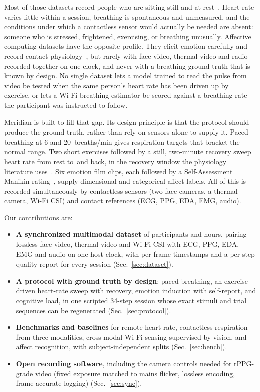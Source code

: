 \documentclass[10pt,twocolumn,letterpaper]{article}
\newcommand{\ph}[1]{\textbf{\fbox{UNFILLED: #1}}}
\newcommand{\ph}[1]{{\color{red}\texttt{[#1]}}}
\newcommand{\bpm}{\,\mathrm{bpm}}
\newcommand{\dataset}{Meridian\xspace}
\begin{document}
Most of those datasets record people who are sitting still and at rest~\cite{bobbia2019,stricker2014pure}. Heart
rate varies little within a session, breathing is spontaneous and unmeasured, and the conditions under which a
contactless sensor would actually be needed are absent: someone who is stressed, frightened, exercising, or
breathing unusually. Affective computing datasets have the opposite profile. They elicit emotion carefully and
record contact physiology~\cite{koelstra2012,soleymani2012,schmidt2018}, but rarely with face video, thermal video
and radio recorded together on one clock, and never with a breathing ground truth that is known by design. No
single dataset lets a model trained to read the pulse from video be tested when the same person's heart rate has
been driven up by exercise, or lets a Wi-Fi breathing estimator be scored against a breathing rate the participant
was instructed to follow.

\dataset is built to fill that gap. Its design principle is that the protocol should produce the ground truth,
rather than rely on sensors alone to supply it. Paced breathing at 6 and 20~breaths/min gives respiration targets
that bracket the normal range. Two short exercises followed by a still, two-minute recovery sweep heart rate from
rest to \ph{peak}\bpm and back, in the recovery window the physiology literature uses~\cite{cole1999}. Six emotion
film clips, each followed by a Self-Assessment Manikin rating~\cite{bradley1994}, supply dimensional and
categorical affect labels. All of this is recorded simultaneously by contactless sensors (two face cameras, a
thermal camera, Wi-Fi CSI) and contact references (ECG, PPG, EDA, EMG, audio).

Our contributions are:
\begin{itemize}
  \item \textbf{A synchronized multimodal dataset} of \ph{N} participants and \ph{H} hours, pairing lossless face
    video, thermal video and Wi-Fi CSI with ECG, PPG, EDA, EMG and audio on one host clock, with per-frame
    timestamps and a per-step quality report for every session (Sec.~\ref{sec:dataset}).
  \item \textbf{A protocol with ground truth by design}: paced breathing, an exercise-driven heart-rate sweep with
    recovery, emotion induction with self-report, and cognitive load, in one scripted 34-step session whose exact
    stimuli and trial sequences can be regenerated (Sec.~\ref{sec:protocol}).
  \item \textbf{Benchmarks and baselines} for remote heart rate, contactless respiration from three modalities,
    cross-modal Wi-Fi sensing supervised by vision, and affect recognition, with subject-independent splits
    (Sec.~\ref{sec:bench}).
  \item \textbf{Open recording software}, including the camera controls needed for rPPG-grade video (fixed
    exposure matched to mains flicker, lossless encoding, frame-accurate logging) (Sec.~\ref{sec:sync}).
\end{itemize}
\end{document}
